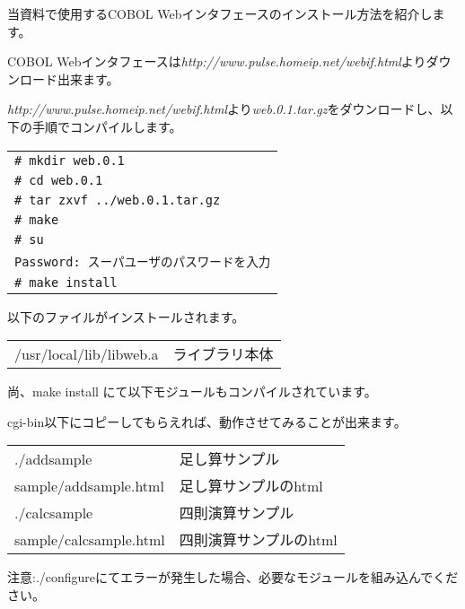 当資料で使用するCOBOL Webインタフェースのインストール方法を紹介します。

COBOL Webインタフェースは{\it http://www.pulse.homeip.net/webif.html}よりダウンロード出来ます。

{\it http://www.pulse.homeip.net/webif.html}より{\it web.0.1.tar.gz}をダウンロードし、以下の手順でコンパイルします。

\begin{tabular}{|l|}
\hline
\verb+# mkdir web.0.1+\\
\verb+# cd web.0.1+\\
\verb+# tar zxvf ../web.0.1.tar.gz+\\
\verb+# make+\\
\verb+# su+\\
\verb+Password: スーパユーザのパスワードを入力+\\
\verb+# make install+\\
\hline
\end{tabular}

以下のファイルがインストールされます。

\begin{tabular}{ll}
/usr/local/lib/libweb.a       &ライブラリ本体\\
\end{tabular}

尚、make install にて以下モジュールもコンパイルされています。

cgi-bin以下にコピーしてもらえれば、動作させてみることが出来ます。

\begin{tabular}{ll}
./addsample        &足し算サンプル\\
sample/addsample.html &足し算サンプルのhtml\\
./calcsample       &四則演算サンプル\\
sample/calcsample.html &四則演算サンプルのhtml\\
\end{tabular}


注意:./configureにてエラーが発生した場合、必要なモジュールを組み込んでください。









